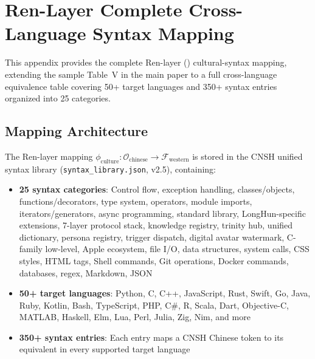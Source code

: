 
\section{Ren-Layer Complete Cross-Language Syntax Mapping}
\label{app:ren-complete}

This appendix provides the complete Ren-layer () cultural-syntax
mapping, extending the sample Table~V in the main paper to a full
cross-language equivalence table covering 50+ target languages and
350+ syntax entries organized into 25 categories.

\subsection{Mapping Architecture}

The Ren-layer mapping $\phi_{\text{culture}}: \mathcal{O}_{\text{chinese}} \to
\mathcal{F}_{\text{western}}$ is stored in the CNSH unified syntax library
(\texttt{syntax\_library.json}, v2.5), containing:

\begin{itemize}
  \item \textbf{25 syntax categories}: Control flow, exception handling,
    classes/objects, functions/decorators, type system, operators, module
    imports, iterators/generators, async programming, standard library,
    LongHun-specific extensions, 7-layer protocol stack, knowledge registry,
    trinity hub, unified dictionary, persona registry, trigger dispatch,
    digital avatar watermark, C-family low-level, Apple ecosystem, file I/O,
    data structures, system calls, CSS styles, HTML tags, Shell commands,
    Git operations, Docker commands, databases, regex, Markdown, JSON
  \item \textbf{50+ target languages}: Python, C, C++, JavaScript, Rust,
    Swift, Go, Java, Ruby, Kotlin, Bash, TypeScript, PHP, C\#, R, Scala,
    Dart, Objective-C, MATLAB, Haskell, Elm, Lua, Perl, Julia, Zig, Nim,
    and more
  \item \textbf{350+ syntax entries}: Each entry maps a CNSH Chinese token
    to its equivalent in every supported target language
\end{itemize}

